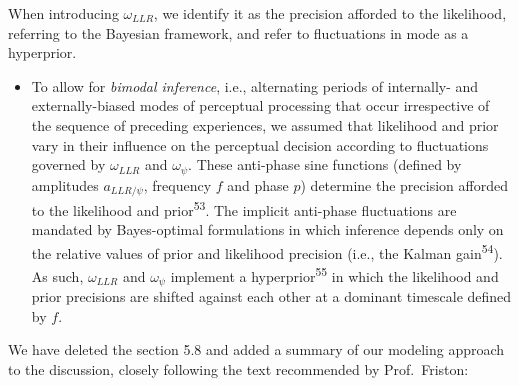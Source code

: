 \documentclass[
]{article}
\providecommand{\tightlist}{%
  \setlength{\itemsep}{0pt}\setlength{\parskip}{0pt}}
\begin{document}
When introducing \(\omega_{LLR}\), we identify it as the precision
afforded to the likelihood, referring to the Bayesian framework, and
refer to fluctuations in mode as a hyperprior.

\begin{itemize}
\tightlist
\item
  To allow for \emph{bimodal inference}, i.e., alternating periods of
  internally- and externally-biased modes of perceptual processing that
  occur irrespective of the sequence of preceding experiences, we
  assumed that likelihood and prior vary in their influence on the
  perceptual decision according to fluctuations governed by
  \(\omega_{LLR}\) and \(\omega_{\psi}\). These anti-phase sine
  functions (defined by amplitudes \(a_{LLR/\psi}\), frequency \(f\) and
  phase \(p\)) determine the precision afforded to the likelihood and
  prior\textsuperscript{53}. The implicit anti-phase fluctuations are
  mandated by Bayes-optimal formulations in which inference depends only
  on the relative values of prior and likelihood precision (i.e., the
  Kalman gain\textsuperscript{54}). As such, \(\omega_{LLR}\) and
  \(\omega_{\psi}\) implement a hyperprior\textsuperscript{55} in which
  the likelihood and prior precisions are shifted against each other at
  a dominant timescale defined by \(f\).
\end{itemize}

We have deleted the section 5.8 and added a summary of our modeling
approach to the discussion, closely following the text recommended by
Prof.~Friston:
\end{document}
